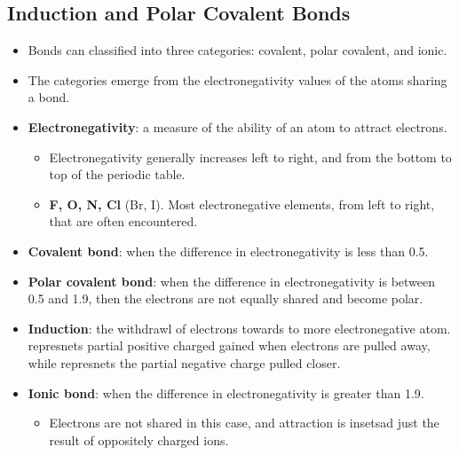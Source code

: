 \documentclass[12pt,a4paper]{article}
\begin{document}
\subsection{Induction and Polar Covalent Bonds}
\begin{itemize}
    \item Bonds can classified into three categories: covalent, polar covalent, and ionic.
    \item The categories emerge from the electronegativity values of the atoms sharing a bond.
    \item \textbf{Electronegativity}: a measure of the ability of an atom to attract electrons.
        \begin{itemize}
            \item Electronegativity generally {\color{o-Sun}increases left to right}, and from the {\color{o-Sun}bottom to top} of the periodic table.
            \item \textbf{F, O, N, Cl} (Br, I). Most electronegative elements, from left to right, that are often encountered.
        \end{itemize}
    \item \textbf{Covalent bond}: when the difference in electronegativity is {\color{o-Sun}less than 0.5}.
    \item \textbf{Polar covalent bond}: when the difference in electronegativity is {\color{o-Sun}between 0.5 and 1.9}, then the electrons are not equally shared and become polar.
    \item \textbf{Induction}: the withdrawl of electrons towards to more electronegative atom. {\color{pos}\ch{$\delta$^+}} represnets partial positive charged gained when electrons are pulled away, while {\color{neg}\ch{$\delta$^-}} represnets the partial negative charge pulled closer.
    \item \textbf{Ionic bond}: when the difference in electronegativity is {\color{o-Sun}greater than 1.9}.
        \begin{itemize}
            \item Electrons are not shared in this case, and attraction is insetsad just the result of oppositely charged ions.
        \end{itemize}
\end{itemize}
\end{document}
